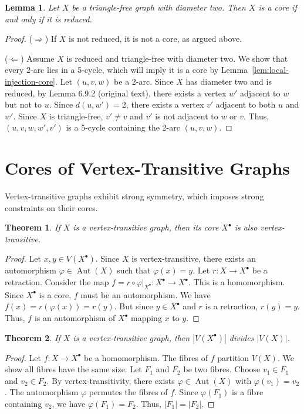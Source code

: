 \documentclass[12pt,a4paper,openany]{book}
\newtheorem{theorem}{Theorem}[section]
\newtheorem{lemma}{Lemma}[section]
\begin{document}
\begin{lemma}\label{lem:reduced-diameter2}
Let $X$ be a triangle-free graph with diameter two. Then $X$ is a core if and only if it is reduced.
\end{lemma}
\begin{proof}
($\Rightarrow$) If $X$ is not reduced, it is not a core, as argued above.
\smallskip

($\Leftarrow$) Assume $X$ is reduced and triangle-free with diameter two. We show that every 2-arc lies in a 5-cycle, which will imply it is a core by Lemma~\ref{lem:local-injection-core}. Let $(u, v, w)$ be a 2-arc. Since $X$ has diameter two and is reduced, by Lemma 6.9.2 (original text), there exists a vertex $w'$ adjacent to $w$ but not to $u$. Since $d(u, w') = 2$, there exists a vertex $v'$ adjacent to both $u$ and $w'$. Since $X$ is triangle-free, $v' \neq v$ and $v'$ is not adjacent to $w$ or $v$. Thus, $(u, v, w, w', v')$ is a 5-cycle containing the 2-arc $(u, v, w)$.
\end{proof}

\section{Cores of Vertex-Transitive Graphs}

Vertex-transitive graphs exhibit strong symmetry, which imposes strong constraints on their cores.

\begin{theorem}\label{thm:vt-core-vt}
If $X$ is a vertex-transitive graph, then its core $X^\bullet$ is also vertex-transitive.
\end{theorem}
\begin{proof}
Let $x, y \in V(X^\bullet)$. Since $X$ is vertex-transitive, there exists an automorphism $\varphi \in \operatorname{Aut}(X)$ such that $\varphi(x) = y$. Let $r: X \to X^\bullet$ be a retraction. Consider the map $f = r \circ \varphi|_{X^\bullet}: X^\bullet \to X^\bullet$. This is a homomorphism. Since $X^\bullet$ is a core, $f$ must be an automorphism. We have $f(x) = r(\varphi(x)) = r(y)$. But since $y \in X^\bullet$ and $r$ is a retraction, $r(y) = y$. Thus, $f$ is an automorphism of $X^\bullet$ mapping $x$ to $y$.
\end{proof}

\begin{theorem}\label{thm:vt-core-divisor}
If $X$ is a vertex-transitive graph, then $|V(X^\bullet)|$ divides $|V(X)|$.
\end{theorem}
\begin{proof}
Let $f: X \to X^\bullet$ be a homomorphism. The fibres of $f$ partition $V(X)$. We show all fibres have the same size. Let $F_1$ and $F_2$ be two fibres. Choose $v_1 \in F_1$ and $v_2 \in F_2$. By vertex-transitivity, there exists $\varphi \in \operatorname{Aut}(X)$ with $\varphi(v_1) = v_2$. The automorphism $\varphi$ permutes the fibres of $f$. Since $\varphi(F_1)$ is a fibre containing $v_2$, we have $\varphi(F_1) = F_2$. Thus, $|F_1| = |F_2|$.
\end{proof}
\end{document}
